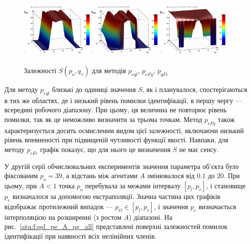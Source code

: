 \documentclass[a4paper,13pt]{atuaref}
\begin{document}
\begin{figure}[htb!]
  \centerline{
    \includegraphics[width=0.32\textwidth]{p3/p/qls_pe-p_po_qg_Sql_all.png}
    \hfill
    \includegraphics[width=0.32\textwidth]{p3/p/qls_pe-p_po_qg_SFq_all.png}
    \hfill
    \includegraphics[width=0.32\textwidth]{p3/p/qls_pe-p_po_qg_SFc_all.png}
  }
  \caption{Залежності $S(p_o,q_\gamma)$ для методів $p_{eql}$, $p_{eFq}$, $p_{qFc}$}
  \label{atu:f:qsl_S_po_qg_all}
\end{figure}

Для методу $ p_{eql} $ близькі до одиниці значення $ S $, як і планувалося,
спостерігаються в тих же областях, де і низький рівень помилки ідентифікації, в
першу чергу --- всередині робочого діапазону. При цьому, ця величина не
повторює рівень помилки, так як це неможливо визначити за трьома точкам. Метод
$ p_ {eFq} $ також характеризується досить осмисленим видом цієї залежності,
включаючи низький рівень впевненості при підвищеній чутливості функції якості.
Навпаки, для методу $ p_ {eFc} $ графік показує, що для нього це визначення $ S$ не має сенсу.

У другій серії обчислювальних експериментів значення параметра об'єкта було
фіксованим $ p_o = 39 $, а відстань між агентами $ A $ змінювалося від $ 0.1 $
до $ 20 $. При цьому, при $ A <1 $ точка $ p_o $ перебувала за межами інтервалу
$ [p_l, p_r] $, і становище $ p_e $ визначалося за допомогою екстраполяції.
Значна частина цих графіків відображає протилежний випадок --- $ p_O \in [p_l,p_r] $,
і значення $ p_e $ визначається інтерполяцією на розширенні (з ростом $A $) діапазоні.
На рис.~\ref{atu:f:qsl_pe_A_qg_all} представлені поверхні залежностей помилок ідентифікації
при наявності всіх нелінійних членів.
\end{document}
